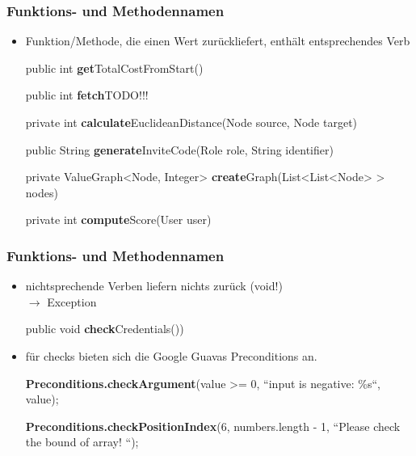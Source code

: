 \begin{frame}
  \frametitle{Funktions- und Methodennamen}
  \begin{itemize}
  \item Funktion/Methode, die einen Wert zurückliefert, enthält entsprechendes Verb 
  \vspace{2mm}
  \begin{Beispiel}
  \par public int \textbf{get}TotalCostFromStart()
  \vspace{2mm}
  \par public int \textbf{fetch}TODO!!!
  \vspace{2mm}
  \par private int \textbf{calculate}EuclideanDistance(Node source, Node target)
  \vspace{2mm}
  \par public String \textbf{generate}InviteCode(Role role, String identifier)
  \vspace{2mm}
  \par private ValueGraph<Node, Integer> \textbf{create}Graph(List<List<Node> > nodes)
  \vspace{2mm}
  \par private int \textbf{compute}Score(User user)
  \end{Beispiel}
  \end{itemize}
\end{frame}

\begin{frame}
  \frametitle{Funktions- und Methodennamen}
  \begin{itemize}
  \item nichtsprechende Verben liefern nichts zurück (void!) \\ $\rightarrow$ Exception
  \begin{Beispiel}
  \par public void \textbf{check}Credentials())
  \end{Beispiel} 
  \vspace{3mm}
  \item für checks bieten sich die Google Guavas Preconditions an.
  \begin{Beispiel}
  \par \textbf{Preconditions.checkArgument}(value >= 0, ``input is negative: \%s``, value);
  \vspace{2mm}
  \par \textbf{Preconditions.checkPositionIndex}(6, numbers.length - 1, ``Please check the bound of array! ``);
  \end{Beispiel}
  \end{itemize}
\end{frame}

